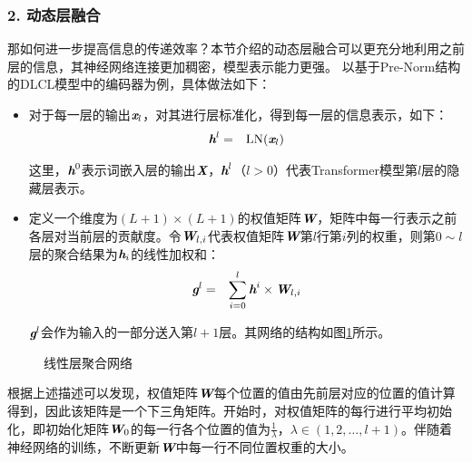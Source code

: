 \subsubsection{2. 动态层融合}

\parinterval 那如何进一步提高信息的传递效率？本节介绍的动态层融合可以更充分地利用之前层的信息，其神经网络连接更加稠密，模型表示能力更强。 以基于Pre-Norm结构的DLCL模型中的编码器为例，具体做法如下：

\begin{itemize}
\vspace{0.5em}
\item 对于每一层的输出$\textbf{\em x}_{l}$，对其进行层标准化，得到每一层的信息表示，如下：
\begin{eqnarray}
\textbf{\em h}^l &=& \textrm{LN}(\textbf{\em x}_{l})
\label{eq:15-37}
\end{eqnarray}

\noindent 这里，$\textbf{\em h}^0$表示词嵌入层的输出$\textbf{\em X}$，$\textbf{\em h}^l$（$l>0$）代表Transformer模型第$l$层的隐藏层表示。

\vspace{0.5em}
\item 定义一个维度为$(L+1)\times (L+1)$的权值矩阵$\textbf{\em W}$，矩阵中每一行表示之前各层对当前层的贡献度。令$\textbf{\em W}_{l,i}$代表权值矩阵$\textbf{\em W}$第$l$行第$i$列的权重，则第$0 \sim l$ 层的聚合结果为$\textbf{\em h}_i$的线性加权和：
\begin{eqnarray}
\textbf{\em g}^l &=& \sum_{i=0}^{l}\textbf{\em h}^i\times \textbf{\em W}_{l,i}
\label{eq:15-38}
\end{eqnarray}

\noindent $\textbf{\em g}^l$会作为输入的一部分送入第$l+1$层。其网络的结构如图\ref{fig:15-13}所示。
\vspace{0.5em}
\end{itemize}

\begin{figure}[htp]
\centering

\caption{线性层聚合网络}
\label{fig:15-13}
\end{figure}

\parinterval 根据上述描述可以发现，权值矩阵$\textbf{\em W}$每个位置的值由先前层对应的位置的值计算得到，因此该矩阵是一个下三角矩阵。开始时，对权值矩阵的每行进行平均初始化，即初始化矩阵$\textbf{\em W}_0$的每一行各个位置的值为$\frac{1}{\lambda}$，$\lambda \in (1,2,\ldots,l+1)$。伴随着神经网络的训练，不断更新$\textbf{\em W}$中每一行不同位置权重的大小。

